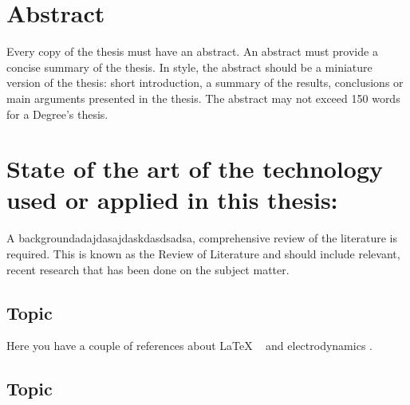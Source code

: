 \documentclass[a4paper,12pt]{article}
\begin{document}
\newpage
\tableofcontents

\newpage
\listoffigures
\lstlistoflistings
\listoftables

\newpage

\newpage
\section*{Abstract}

{Every copy of the thesis must have an abstract. An abstract must provide a concise summary of the thesis. In style, the
abstract should be a miniature version of the thesis: short introduction, a summary of the results, conclusions or main
arguments presented in the thesis. The abstract may not exceed 150 words for a Degree’s thesis.}

\newpage


\newpage



\clearpage\section{State of the art of the technology used or applied in this thesis:}

{A backgroundadajdasajdaskdasdsadsa, comprehensive review of the literature is required. This is known as the Review of Literature and should
include relevant, recent research that has been done on the subject matter.}

\subsection{Topic}

Here you have a couple of references about LaTeX ~\cite{latexcompanion} and electrodynamics \cite{einstein}.

\bigskip

\subsection{Topic}


\end{document}
